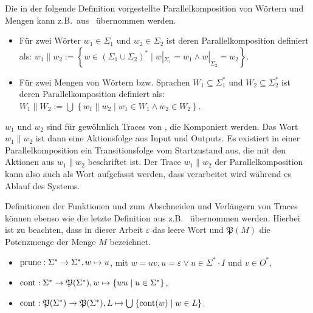 Die in der folgende Definition vorgestellte Parallelkomposition von Wörtern und
Mengen kann z.B.\ aus~\cite{Vogler2014EIO} übernommen werden.

\begin{Def}\mbox{}
  \begin{itemize}
    \item Für zwei Wörter $w_1\in\Sigma _1$ und $w_2\in\Sigma _2$ ist
      deren Parallelkomposition definiert als: $w_1\| w_2:=\left\{w\in
      (\Sigma _1\cup\Sigma _2)^*\mid w|_{\Sigma _1}=w_1\wedge w|_{\Sigma
    _2}=w_2\right\}$.
    \item Für zwei Mengen von Wörtern bzw. Sprachen $W_1\subseteq \Sigma
      ^*_1$ und $W_2\subseteq \Sigma ^*_2$ ist deren Parallelkomposition
      definiert als: $W_1\| W_2:=\bigcup\hspace{1pt}\left\{w_1\| w_2\mid
      w_1\in W_1\wedge w_2\in W_2\right\}$.
  \end{itemize}
\end{Def}

$w_1$ und $w_2$ sind für gewöhnlich Traces von \MEIO{}, die Komponiert werden.
Das Wort $w_1\|w_2$ ist dann eine Aktionsfolge aus Input und Outputs. Es
existiert in einer Parallelkomposition ein Transitionsfolge vom Startzustand
aus, die mit den Aktionen aus $w_1\|w_2$ beschriftet ist. Der Trace $w_1\|w_2$
der Parallelkomposition kann also auch als Wort aufgefasst werden, dass
verarbeitet wird während es Ablauf des Systems.

Definitionen der Funktionen \prune{} und \cont{} zum Abschneiden und Verlängern
von Traces können ebenso wie die letzte Definition aus
z.B.~\cite{Vogler2014EIO} übernommen werden. Hierbei ist zu beachten, dass in
dieser Arbeit $\varepsilon$ das leere Wort und $\mathfrak{P}(M)$ die
Potenzmenge der Menge $M$ bezeichnet.

\begin{Def}\mbox{}
  \begin{itemize}
    \item $\mathrm{prune}{}:\Sigma ^*\rightarrow\Sigma ^*, w\mapsto u$, mit $w=uv,
      u=\varepsilon\vee u\in\Sigma ^*\cdot I$ und $v\in O^*$,
    \item $\mathrm{cont}{}:\Sigma ^*\rightarrow\mathfrak{P}(\Sigma ^*),
      w\mapsto\left\{wu\mid u\in\Sigma ^*\right\}$,
    \item $\mathrm{cont}{}:\mathfrak{P}(\Sigma ^*)\rightarrow\mathfrak{P}(\Sigma ^*),
      L\mapsto\bigcup\hspace{1pt}\left\{\mathrm{cont}{}(w)\mid w\in L\right\}$.
  \end{itemize}
\end{Def}

